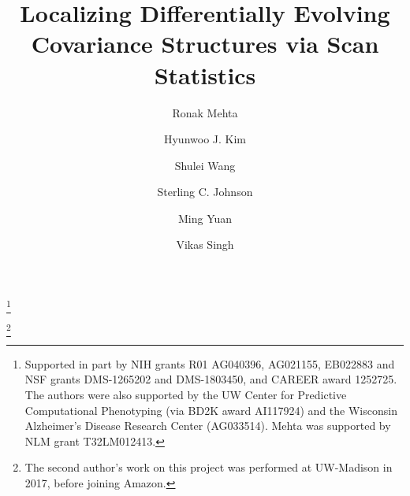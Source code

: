 \documentclass{qam-l}
\theoremstyle{definition}
\theoremstyle{remark}
\numberwithin{equation}{section}
\begin{document}
\title[Localizing Differentially Evolving Covariance Structures]{Localizing Differentially Evolving Covariance Structures via Scan Statistics}


\author[Mehta]{Ronak Mehta}
\address{Department of Computer Sciences, University of Wisconsin-Madison, Madison, WI 53706, USA}
\thanks{Supported in part by NIH grants R01 AG040396, AG021155, EB022883 and NSF grants DMS-1265202 and DMS-1803450, and CAREER award 1252725. The authors were also supported by the UW Center for Predictive Computational Phenotyping (via BD2K award AI117924) and the Wisconsin Alzheimer's Disease Research Center (AG033514). Mehta was supported by NLM grant T32LM012413.}

\author[Kim]{Hyunwoo J. Kim}
\address{Department of Computer Sciences, University of Wisconsin-Madison, Madison, WI 53706, USA}
\thanks{The second author's work on this project was performed at UW-Madison in 2017, before joining Amazon.}

\author[Wang]{Shulei Wang}
\address{Department of Statistics, Columbia University, New York, NY 10027, USA}

\author[Johnson]{Sterling C. Johnson}
\address{Alzheimer's Disease Research Center, University of Wisconsin-Madison, Madison, WI 53792, USA}

\author[Yuan]{Ming Yuan}
\address{Department of Statistics, Columbia University, New York, NY 10027, USA}

\author[Singh]{Vikas Singh}
\address{Department of Biostatistics and Medical Informatics, University of Wisconsin-Madison, Madison, WI 53706, USA}

\end{document}
